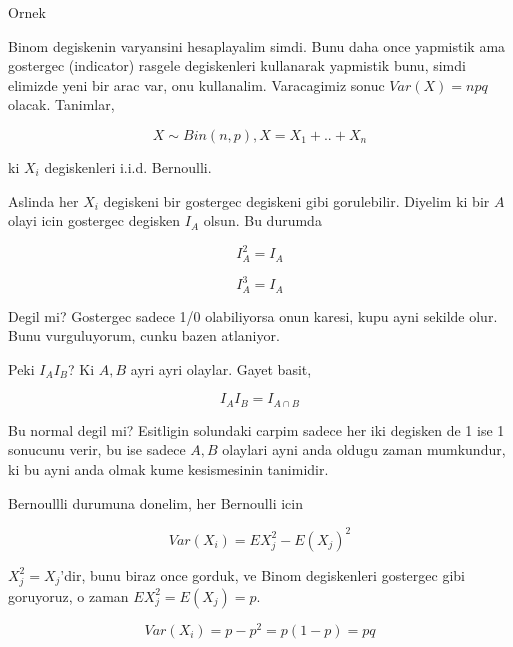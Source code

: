 \documentclass[12pt,fleqn]{article}\usepackage{../common}
\begin{document}
Ornek

Binom degiskenin varyansini hesaplayalim simdi. Bunu daha once yapmistik
ama gostergec (indicator) rasgele degiskenleri kullanarak yapmistik bunu,
simdi elimizde yeni bir arac var, onu kullanalim. Varacagimiz sonuc 
$Var(X) = npq$ olacak. Tanimlar,

$$ X \sim Bin(n,p), X = X_1+..+X_n $$

ki $X_i$ degiskenleri i.i.d. Bernoulli. 

Aslinda her $X_i$ degiskeni bir gostergec degiskeni gibi
gorulebilir. Diyelim ki bir $A$ olayi icin gostergec degisken $I_A$
olsun. Bu durumda

$$ I_A^2 = I_A $$

$$ I_A^3 = I_A $$

Degil mi? Gostergec sadece 1/0 olabiliyorsa onun karesi, kupu ayni sekilde
olur. Bunu vurguluyorum, cunku bazen atlaniyor. 

Peki $I_AI_B$? Ki $A,B$ ayri ayri olaylar. Gayet basit, 

$$ I_AI_B = I_{A \cap B} $$

Bu normal degil mi? Esitligin solundaki carpim sadece her iki degisken de 1
ise 1 sonucunu verir, bu ise sadece $A,B$ olaylari ayni anda oldugu zaman
mumkundur, ki bu ayni anda olmak kume kesismesinin tanimidir. 

Bernoullli durumuna donelim, her Bernoulli icin

$$ Var(X_i) = EX_j^2 - E(X_j)^2 $$

$X_j^2 = X_j$'dir, bunu biraz once gorduk, ve Binom degiskenleri gostergec
gibi goruyoruz, o zaman $EX_j^2 = E(X_j) = p$. 

$$ Var(X_i) = p - p^2 = p(1-p) = pq$$
\end{document}

